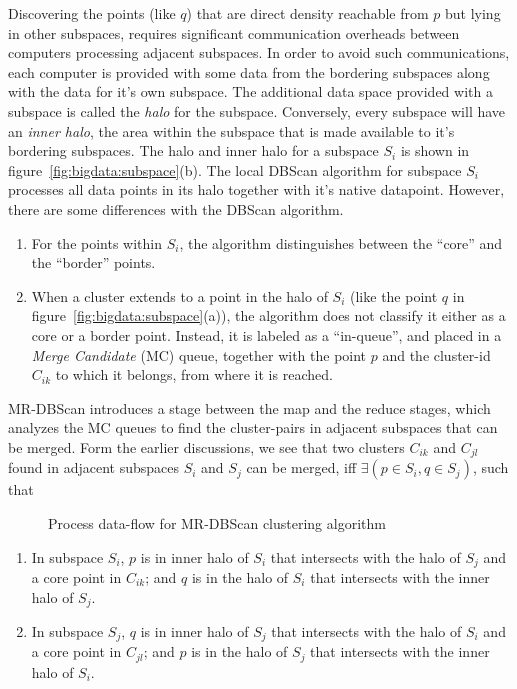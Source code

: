 Discovering the points (like $q$) that are direct density reachable from $p$ but lying in other subspaces, requires significant 
communication overheads between computers processing adjacent subspaces. In order to avoid such communications, each computer is
provided with some data from the bordering subspaces along with the data for it's own subspace. The additional data space provided 
with a subspace is called the {\em halo} for the subspace. Conversely, every subspace will have an {\em inner halo}, the area 
within the subspace that is made available to it's bordering subspaces. The halo and inner halo for a subspace $S_i$ is shown in
figure~\ref{fig:bigdata:subspace}(b).  
%
The local DBScan algorithm for subspace $S_i$ processes all data points in its halo together with it's native datapoint. However,
there are some differences with the DBScan algorithm. 
\begin{enumerate}
	\item For the points within $S_i$, the algorithm distinguishes between the ``core'' and the ``border'' points.
	\item When a cluster extends to a point in the halo of $S_i$ (like the point $q$ in figure~\ref{fig:bigdata:subspace}(a)), the 
		algorithm does not classify it either as a core or a border point. Instead, it is labeled as a ``in-queue'', and
		placed in a {\em Merge Candidate} (MC) queue, together with the point $p$ and the cluster-id $C_{ik}$ to which it
		belongs, from where it is reached.
\end{enumerate}

\noindent
MR-DBScan introduces a stage between the map and the reduce stages, which analyzes the MC queues to find the cluster-pairs in 
adjacent subspaces that can be merged. Form the earlier discussions, we see that two clusters $C_{ik}$ and $C_{jl}$ found in 
adjacent subspaces $S_i$ and $S_j$ can be merged, iff $\exists (p \in S_i, q \in S_j)$, such that

\begin{figure}[htbp!]
	\centerline{
	}
	\caption{Process data-flow for MR-DBScan clustering algorithm}
	\label{fig:bigdata:mrdbscan}
\end{figure}

\begin{enumerate}
	\item In subspace $S_i$, $p$ is in inner halo of $S_i$ that intersects with the halo of $S_j$ and a core point in $C_{ik}$; 
		and $q$ is in the halo of $S_i$ that intersects with the inner halo of $S_j$.
	\item In subspace $S_j$, $q$ is in inner halo of $S_j$ that intersects with the halo of $S_i$ and a core point in $C_{jl}$; 
		and $p$ is in the halo of $S_j$ that intersects with the inner halo of $S_i$.
\end{enumerate}

